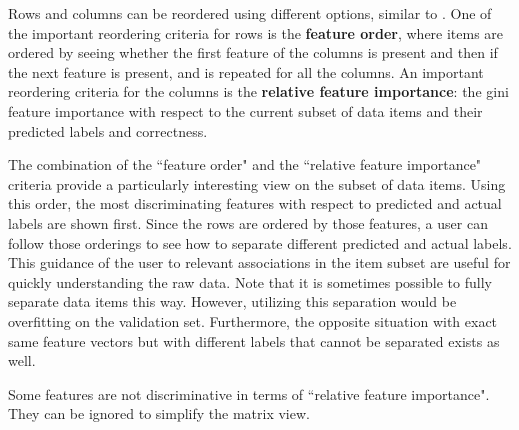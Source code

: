 Rows and columns can be reordered using different options, similar to \tabB.
One of the important reordering criteria for rows is the \textbf{feature order}, where items are ordered by seeing whether the first feature of the columns is present and then if the next feature is present, and is repeated for all the columns.
An important reordering criteria for the columns is the \textbf{relative feature importance}: the gini feature importance with respect to the current subset of data items and their predicted labels and correctness.




The combination of the ``feature order" and the ``relative feature importance" criteria provide a particularly interesting view on the subset of data items.
Using this order, the most discriminating features with respect to predicted and actual labels are shown first.
Since the rows are ordered by those features, a user can follow those orderings to see how to separate different predicted and actual labels.
This guidance of the user to relevant associations in the item subset are useful for quickly understanding the raw data.
Note that it is sometimes possible to fully separate data items this way.
However, utilizing this separation would be overfitting on the validation set.
Furthermore, the opposite situation with exact same feature vectors but with different labels that cannot be separated exists as well.

Some features are not discriminative in terms of ``relative feature importance". They can be ignored to simplify the matrix view.
